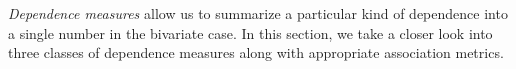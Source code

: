 
\textit{Dependence measures} allow us to summarize a particular kind of dependence into a single number in the bivariate case.
In this section, we take a closer look into three classes of dependence measures along with appropriate association metrics.

